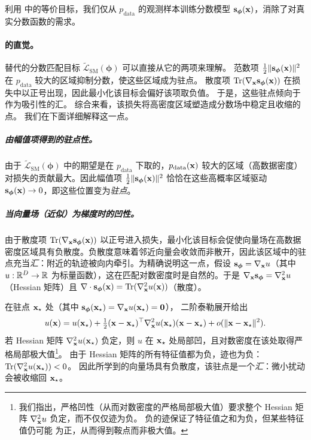 利用  中的等价目标，我们仅从 $p_{\mathrm{data}}$ 的观测样本训练分数模型 ${\mathbf{s}}_{\bm{\phi}}({\mathbf{x}})$，消除了对真实分数函数的需求。


\paragraph{ 的直觉。}
替代的分数匹配目标 $\widetilde{\mathcal{L}}_{\text{SM}}(\bm\phi)$
可以直接从它的两项来理解。
范数项 $\tfrac12\|{\mathbf{s}}_{\bm\phi}({\mathbf{x}})\|^2$ 在
$p_{\mathrm{data}}$ 较大的区域抑制分数，使这些区域成为驻点。
散度项 $\operatorname{Tr}(\nabla_{{\mathbf{x}}} {\mathbf{s}}_{\bm\phi}({\mathbf{x}}))$ 在损失中以正号出现，因此最小化该目标会偏好该项取负值。
于是，这些驻点倾向于作为吸引性的汇。
综合来看，该损失将高密度区域塑造成分数场中稳定且收缩的点。
我们在下面详细解释这一点。

\subparagraph{由幅值项得到的驻点性。}
由于 $\widetilde{\mathcal{L}}_{\mathrm{SM}}(\bm\phi)$ 中的期望是在
$p_{\mathrm{data}}$ 下取的，$p_{\mathrm{data}}({\mathbf{x}})$ 较大的区域（高数据密度）
对损失的贡献最大。因此幅值项
$\tfrac12\|{\mathbf{s}}_{\bm\phi}({\mathbf{x}})\|^2$ 恰恰在这些高概率区域驱动
${\mathbf{s}}_{\bm\phi}({\mathbf{x}})\to 0$，即这些位置变为\emph{驻点}。

\subparagraph{当向量场（近似）为梯度时的凹性。}
由于散度项 $\operatorname{Tr}(\nabla_{{\mathbf{x}}} {\mathbf{s}}_{\bm\phi}({\mathbf{x}}))$ 以正号进入损失，最小化该目标会促使向量场在高数据密度区域具有负散度。负散度意味着邻近向量会收敛而非散开，因此该区域中的驻点充当\emph{汇}：附近的轨迹被向内牵引。为精确说明这一点，假设
${\mathbf{s}}_{\bm\phi}=\nabla_{{\mathbf{x}}}u$（其中 $u:\mathbb{R}^D\to\mathbb{R}$ 为标量函数），这在匹配对数密度时是自然的。于是 $\nabla_{{\mathbf{x}}}{\mathbf{s}}_{\bm\phi}=\nabla_{{\mathbf{x}}}^2 u$（Hessian 矩阵）且
$\nabla \cdot {\mathbf{s}}_{\bm\phi}({\mathbf{x}})=\operatorname{Tr}(\nabla_{{\mathbf{x}}}^2 u({\mathbf{x}}))$（散度）。

在驻点 ${\mathbf{x}}_\star$ 处（其中 ${\mathbf{s}}_{\bm\phi}({\mathbf{x}}_\star)=\nabla_{{\mathbf{x}}}u({\mathbf{x}}_\star)=\mathbf{0}$），
二阶泰勒展开给出
\[
u({\mathbf{x}})
= u({\mathbf{x}}_\star)
+ \tfrac12({\mathbf{x}}-{\mathbf{x}}_\star)^\top \nabla_{{\mathbf{x}}}^2 u({\mathbf{x}}_\star)({\mathbf{x}}-{\mathbf{x}}_\star)
+ o(\|{\mathbf{x}}-{\mathbf{x}}_\star\|^2).
\]
若 Hessian 矩阵 $\nabla_{{\mathbf{x}}}^2 u({\mathbf{x}}_\star)$ 负定，则 $u$ 在
${\mathbf{x}}_\star$ 处局部凹，且对数密度在该处取得严格局部极大值\footnote{我们指出，严格凹性（从而对数密度的严格局部极大值）要求整个 Hessian 矩阵
$\nabla_{{\mathbf{x}}}^2 u$ 负定，而不仅仅迹为负。
负的迹保证了特征值之和为负，但某些特征值仍可能
为正，从而得到鞍点而非极大值。
}。
由于 Hessian 矩阵的所有特征值都为负，迹也为负：
$\operatorname{Tr}(\nabla_{{\mathbf{x}}}^2 u({\mathbf{x}}_\star))<0$。
因此所学到的向量场具有负散度，该驻点是一个\emph{汇}：微小扰动会被收缩回 ${\mathbf{x}}_\star$。




